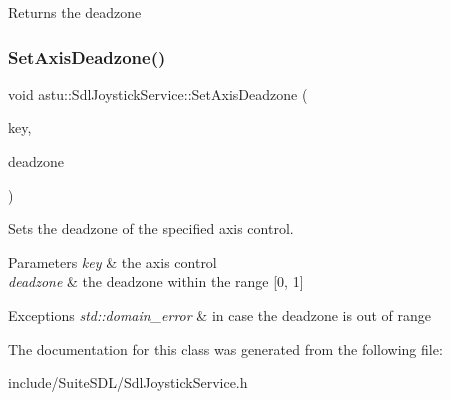 \begin{DoxyReturn}{Returns}
the deadzone 
\end{DoxyReturn}
\mbox{\label{classastu_1_1SdlJoystickService_aed9cd0e2cd443e5592f74133df36ed68}} 
\subsubsection{\texorpdfstring{Set\+Axis\+Deadzone()}{SetAxisDeadzone()}}
{\footnotesize\ttfamily void astu\+::\+Sdl\+Joystick\+Service\+::\+Set\+Axis\+Deadzone (\begin{DoxyParamCaption}\item[{const \hyperlink{classastu_1_1Key}{Key} \&}]{key,  }\item[{float}]{deadzone }\end{DoxyParamCaption})}

Sets the deadzone of the specified axis control.


\begin{DoxyParams}{Parameters}
{\em key} & the axis control \\
\hline
{\em deadzone} & the deadzone within the range \mbox{[}0, 1\mbox{]} \\
\hline
\end{DoxyParams}

\begin{DoxyExceptions}{Exceptions}
{\em std\+::domain\+\_\+error} & in case the deadzone is out of range \\
\hline
\end{DoxyExceptions}


The documentation for this class was generated from the following file\+:\begin{DoxyCompactItemize}
\item 
include/\+Suite\+S\+D\+L/Sdl\+Joystick\+Service.\+h\end{DoxyCompactItemize}
